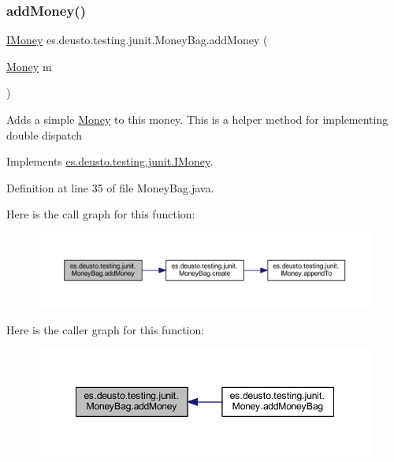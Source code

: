 \subsubsection{\texorpdfstring{add\+Money()}{addMoney()}}
{\footnotesize\ttfamily \hyperlink{interfacees_1_1deusto_1_1testing_1_1junit_1_1_i_money}{I\+Money} es.\+deusto.\+testing.\+junit.\+Money\+Bag.\+add\+Money (\begin{DoxyParamCaption}\item[{\hyperlink{classes_1_1deusto_1_1testing_1_1junit_1_1_money}{Money}}]{m }\end{DoxyParamCaption})}

Adds a simple \hyperlink{classes_1_1deusto_1_1testing_1_1junit_1_1_money}{Money} to this money. This is a helper method for implementing double dispatch 

Implements \hyperlink{interfacees_1_1deusto_1_1testing_1_1junit_1_1_i_money_aab8d4be667a542a8aa1380eb2b6e4257}{es.\+deusto.\+testing.\+junit.\+I\+Money}.



Definition at line 35 of file Money\+Bag.\+java.

Here is the call graph for this function\+:\nopagebreak
\begin{figure}[H]
\begin{center}
\leavevmode
\includegraphics[width=350pt]{classes_1_1deusto_1_1testing_1_1junit_1_1_money_bag_a06ecedbf53ba09d34276fe177e3169bc_cgraph}
\end{center}
\end{figure}
Here is the caller graph for this function\+:\nopagebreak
\begin{figure}[H]
\begin{center}
\leavevmode
\includegraphics[width=348pt]{classes_1_1deusto_1_1testing_1_1junit_1_1_money_bag_a06ecedbf53ba09d34276fe177e3169bc_icgraph}
\end{center}
\end{figure}
\mbox{\label{classes_1_1deusto_1_1testing_1_1junit_1_1_money_bag_ab329e6a2811b83a2b1670b79be92249d}} 
